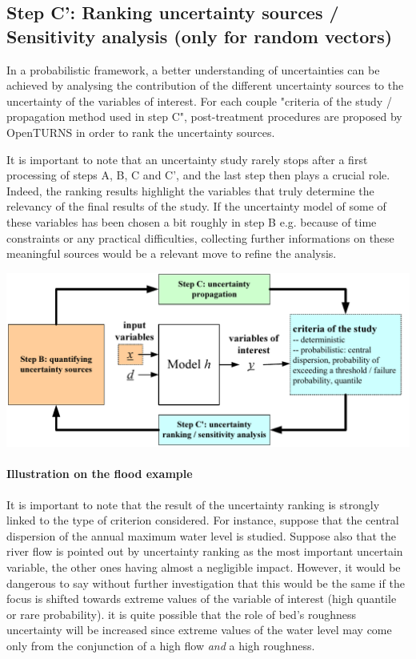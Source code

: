 \subsection{Step C': Ranking uncertainty sources / Sensitivity analysis (only for random vectors)}

In a probabilistic framework, a better understanding of uncertainties can be achieved by analysing the contribution of the different uncertainty sources to the uncertainty of the variables of interest. For each couple "criteria of the study / propagation method used in step C", post-treatment procedures are proposed by OpenTURNS in order to rank the uncertainty sources.

It is important to note that an uncertainty study rarely stops after a first processing of steps A, B, C and C', and the last step then plays a crucial role. Indeed, the ranking results highlight the variables that truly determine the relevancy of the final results of the study. If the uncertainty model of some of these variables has been chosen a bit roughly in step B e.g. because of time constraints or any practical difficulties, collecting further informations on these meaningful sources would be a relevant move to refine the analysis.

\begin{center}
  \includegraphics[scale=0.8]{Figures/flow5.pdf}
\end{center}

\paragraph{Illustration on the flood example}
\par

It is important to note that the result of the uncertainty ranking is strongly linked to the type of criterion considered. For instance, suppose that the central dispersion of the annual maximum water level is studied. Suppose also that the river flow is pointed out by uncertainty ranking as the most important uncertain variable, the other ones having almost a negligible impact. However, it would be dangerous to say without further investigation that this would be the same if the focus is shifted towards extreme values of the variable of interest (high quantile or rare probability). it is quite possible that the role of bed's roughness uncertainty will be increased since extreme values of the water level may come only from the conjunction of a high flow {\em and} a high roughness.
